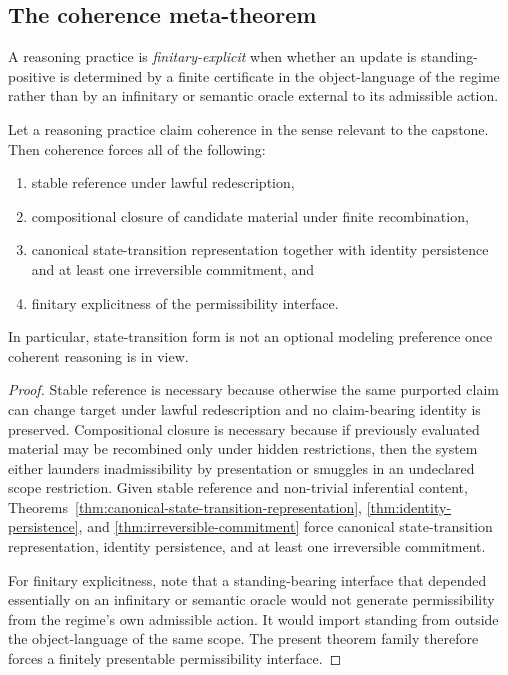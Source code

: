 \subsection{The coherence meta-theorem}

\begin{definition}
A reasoning practice is \emph{finitary-explicit} when whether an update is standing-positive is determined by a finite certificate in the object-language of the regime rather than by an infinitary or semantic oracle external to its admissible action.
\end{definition}

\begin{theorem}
\label{thm:coherence-meta-theorem}
Let a reasoning practice claim coherence in the sense relevant to the capstone. Then coherence forces all of the following:
\begin{enumerate}
  \item stable reference under lawful redescription,
  \item compositional closure of candidate material under finite recombination,
  \item canonical state-transition representation together with identity persistence and at least one irreversible commitment, and
  \item finitary explicitness of the permissibility interface.
\end{enumerate}
In particular, state-transition form is not an optional modeling preference once coherent reasoning is in view.
\end{theorem}

\begin{proof}
Stable reference is necessary because otherwise the same purported claim can change target under lawful redescription and no claim-bearing identity is preserved. Compositional closure is necessary because if previously evaluated material may be recombined only under hidden restrictions, then the system either launders inadmissibility by presentation or smuggles in an undeclared scope restriction. Given stable reference and non-trivial inferential content, Theorems~\ref{thm:canonical-state-transition-representation}, \ref{thm:identity-persistence}, and \ref{thm:irreversible-commitment} force canonical state-transition representation, identity persistence, and at least one irreversible commitment.

For finitary explicitness, note that a standing-bearing interface that depended essentially on an infinitary or semantic oracle would not generate permissibility from the regime's own admissible action. It would import standing from outside the object-language of the same scope. The present theorem family therefore forces a finitely presentable permissibility interface.\cite{MaleyAMetric}
\end{proof}

